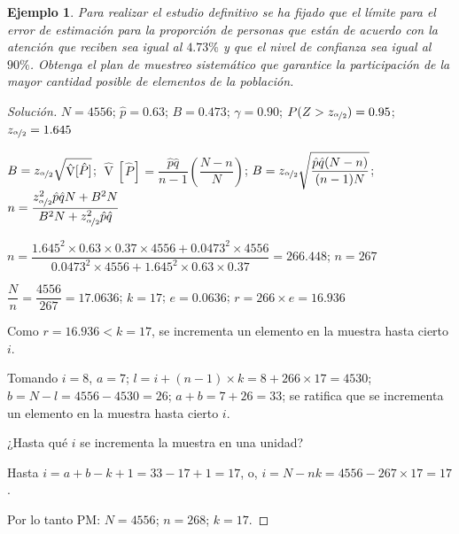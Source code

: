 \documentclass[a5paper,doc,10pt,noapacite]{apa6}
\DeclareMathOperator{\Var}{V}
\newtheorem{ejem}{Ejemplo}
\begin{document}
{{\begin{ejem}
	Para realizar el estudio definitivo se ha fijado que el límite para el error de estimación para la proporción de personas que están de acuerdo con la atención que reciben sea igual al \(4.73\%\) y que el nivel de confianza sea igual al \(90\%\). Obtenga el plan de muestreo sistemático que garantice la participación de la mayor cantidad posible de elementos de la población.
\end{ejem}
\begin{proof}[Solución]
		\(N=4556\); \(\hat{p}=0.63\); \(B=0.473\); \(\gamma=0.90\); \(P(Z>z_{\nicefrac{\alpha}{2}})=0.95\); \(z_{\nicefrac{\alpha}{2}}=1.645\)
		
		\(B=z_{\nicefrac{\alpha}{2}}\sqrt{\hat{\Var}[\hat{P}]}\); \(\hat{\Var}[\hat{P}]=\dfrac{\hat{p}\hat{q}}{n-1}\left(\dfrac{N-n}{N}\right)\); \(B=z_{\nicefrac{\alpha}{2}}\sqrt{\dfrac{\hat{p}\hat{q}(N-n)}{(n-1)N}}\); \(n=\dfrac{z_{\nicefrac{\alpha}{2}}^2\hat{p}\hat{q} N+B^2N}{B^2N+z_{\nicefrac{\alpha}{2}}^2\hat{p}\hat{q}}\)
		
		\(n=\dfrac{1.645^2 \times 0.63 \times 0.37 \times 4556+0.0473^2 \times 4556}{0.0473^2 \times 4556+1.645^2 \times 0.63 \times 0.37}=266.448\); \(n=267\)
		
		\(\dfrac{N}{n}=\dfrac{4556}{267}=17.0636\); \(k=17\); \(e=0.0636\); \(r=266 \times e=16.936\)
		
		Como \(r=16.936<k=17\), se incrementa un elemento en la muestra hasta cierto \(i\).
		
		Tomando \(i=8\), \(a=7\); \(l=i+(n-1) \times k=8+266 \times 17=4530\); \(b=N-l=4556-4530=26\); \(a+b=7+26=33\); se ratifica que se incrementa un elemento en la muestra hasta cierto  \(i\).
		
		¿Hasta qué \(i\) se incrementa la muestra en una unidad?
		
		Hasta \(i=a+b-k+1=33-17+1=17\), o, \(i=N-nk=4556-267 \times 17=17\).
		
		Por lo tanto PM: \(N=4556\); \(n=268\); \(k=17\).
\end{proof}


\nocite{E-1, E-2, E-3, E-4, E-5}
}

\newpage
{}


}
\end{document}
